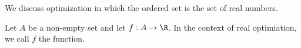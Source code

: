 

We discuss optimization
in which the ordered set
is the set of real numbers.


Let $A$ be a non-empty set and
let $f: A \to \R$.
In the context of
real optimiation, we call $f$
the  function.

